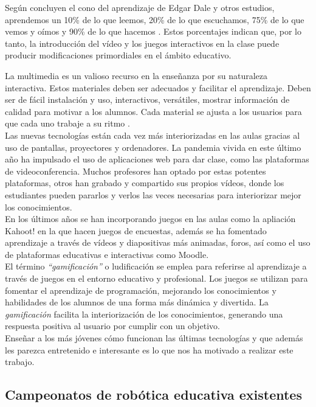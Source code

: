 Según concluyen el cono del aprendizaje de Edgar Dale y otros estudios, aprendemos un 10\% de lo que leemos, 20\% de lo que escuchamos, 75\% de lo que vemos y oímos y 
90\% de lo que hacemos \cite{videoeducativo} \cite{aprendizaje}. Estos porcentajes indican que, por lo tanto, la introducción del vídeo y los juegos interactivos en la clase puede producir modificaciones primordiales en el ámbito educativo.

La multimedia es un valioso recurso en la enseñanza por su naturaleza interactiva. Estos materiales  deben ser adecuados y facilitar el aprendizaje. Deben ser de fácil instalación y uso, interactivos, versátiles, mostrar información de calidad para motivar a los alumnos. Cada material se ajusta a los usuarios para que cada uno trabaje a su ritmo \cite{importanciamultimedia}.
\\
Las nuevas tecnologías están cada vez más interiorizadas en las aulas gracias al uso de pantallas, proyectores y ordenadores. La pandemia vivida en este último año ha impulsado el uso de aplicaciones web para dar clase, como las plataformas de videoconferencia. Muchos profesores han optado por estas potentes plataformas, otros han grabado y compartido sus propios vídeos, donde los estudiantes pueden pararlos y verlos las veces necesarias para interiorizar mejor los conocimientos.
\\
En los últimos años se han incorporando juegos en las aulas como la apliación Kahoot! \cite{kahoot} en la que hacen juegos de encuestas, además se ha fomentado aprendizaje a través de vídeos y diapositivas más animadas, foros, así como el uso de plataformas educativas e interactivas como Moodle.
\\

El término \textit{``gamificación''} o ludificación se emplea para referirse al aprendizaje a través de juegos en el entorno educativo y profesional. Los juegos se utilizan para fomentar el aprendizaje de programación, mejorando los conocimientos y habilidades de los alumnos de una forma más dinámica y divertida. La \textit{gamificación} facilita la interiorización de los conocimientos, generando una respuesta positiva al usuario por cumplir con un objetivo.
 \\
Enseñar a los más jóvenes cómo funcionan las últimas tecnologías y que además les parezca entretenido e interesante es lo que nos ha motivado a realizar este trabajo.
 
 
\subsection{Campeonatos de robótica educativa existentes}

